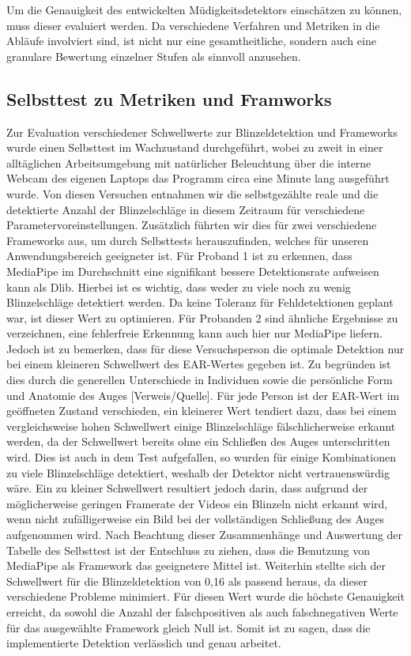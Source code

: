 Um die Genauigkeit des entwickelten Müdigkeitsdetektors einschätzen zu können, muss dieser evaluiert werden. Da verschiedene Verfahren und Metriken in die Abläufe involviert sind, ist nicht nur eine gesamtheitliche, sondern auch eine granulare Bewertung einzelner Stufen als sinnvoll anzusehen. 

\subsection{Selbsttest zu Metriken und Framworks}
\label{subsec:selftest}
Zur Evaluation verschiedener Schwellwerte zur Blinzeldetektion und Frameworks wurde einen Selbsttest im Wachzustand durchgeführt, wobei zu zweit in einer alltäglichen Arbeitsumgebung mit natürlicher Beleuchtung über die interne Webcam des eigenen Laptops das Programm circa eine Minute lang ausgeführt wurde. Von diesen Versuchen entnahmen wir die selbstgezählte reale und die detektierte Anzahl der Blinzelschläge in diesem Zeitraum für verschiedene Parametervoreinstellungen. Zusätzlich führten wir dies für zwei verschiedene Frameworks aus, um durch Selbsttests herauszufinden, welches für unseren Anwendungsbereich geeigneter ist. Für Proband 1 ist zu erkennen, dass MediaPipe im Durchschnitt eine signifikant bessere Detektionsrate aufweisen kann als Dlib. Hierbei ist es wichtig, dass weder zu viele noch zu wenig Blinzelschläge detektiert werden. Da keine Toleranz für Fehldetektionen geplant war, ist dieser Wert zu optimieren. Für Probanden 2 sind ähnliche Ergebnisse zu verzeichnen, eine fehlerfreie Erkennung kann auch hier nur MediaPipe liefern. Jedoch ist zu bemerken, dass für diese Versuchsperson die optimale Detektion nur bei einem kleineren Schwellwert des EAR-Wertes gegeben ist. Zu begründen ist dies durch die generellen Unterschiede in Individuen sowie die persönliche Form und Anatomie des Auges [Verweis/Quelle]. Für jede Person ist der EAR-Wert im geöffneten Zustand verschieden, ein kleinerer Wert tendiert dazu, dass bei einem vergleichsweise hohen Schwellwert einige Blinzelschläge fälschlicherweise erkannt werden, da der Schwellwert bereits ohne ein Schließen des Auges unterschritten wird. Dies ist auch in dem Test aufgefallen, so wurden für einige Kombinationen zu viele Blinzelschläge detektiert, weshalb der Detektor nicht vertrauenswürdig wäre. Ein zu kleiner Schwellwert resultiert jedoch darin, dass aufgrund der möglicherweise geringen Framerate der Videos ein Blinzeln nicht erkannt wird, wenn nicht zufälligerweise ein Bild bei der vollständigen Schließung des Auges aufgenommen wird. Nach Beachtung dieser Zusammenhänge und Auswertung der Tabelle des Selbsttest ist der Entschluss zu ziehen, dass die Benutzung von MediaPipe als Framework das geeignetere Mittel ist. Weiterhin stellte sich der Schwellwert für die Blinzeldetektion von 0,16 als passend heraus, da dieser verschiedene Probleme minimiert. Für diesen Wert wurde die höchste Genauigkeit erreicht, da sowohl die Anzahl der falschpositiven als auch falschnegativen Werte für das ausgewählte Framework gleich Null ist. Somit ist zu sagen, dass die implementierte Detektion verlässlich und genau arbeitet. 

